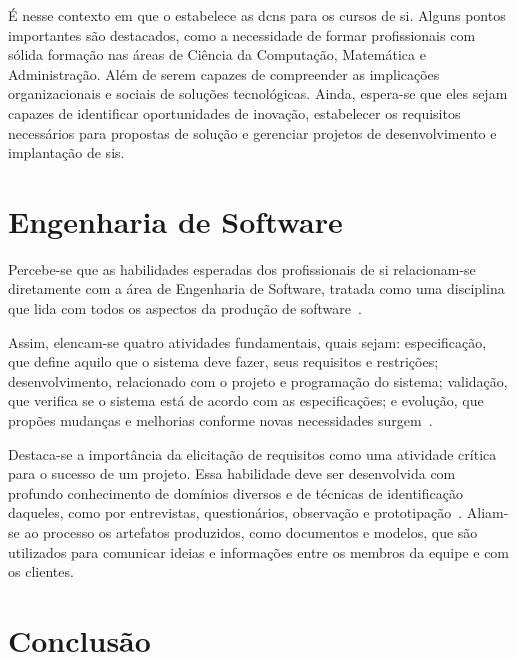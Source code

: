 \documentclass[12pt]{article}
\begin{document}
É nesse contexto em que o \textcite{mec2016dcn} estabelece as \glspl{dcn} para os cursos de \gls{si}.
Alguns pontos importantes são destacados, como a necessidade de formar profissionais com sólida formação nas áreas de Ciência da Computação, Matemática e Administração.
Além de serem capazes de compreender as implicações organizacionais e sociais de soluções tecnológicas.
Ainda, espera-se que eles sejam capazes de identificar oportunidades de inovação, estabelecer os requisitos necessários para propostas de solução e gerenciar projetos de desenvolvimento e implantação de \glspl{si}.

\section{Engenharia de Software}%
\label{sec:engenharia_de_software}

Percebe-se que as habilidades esperadas dos profissionais de \gls{si} relacionam-se diretamente com a área de Engenharia de Software, tratada como uma disciplina que lida com todos os aspectos da produção de software~\cite{sommerville2011software}.

Assim, elencam-se quatro atividades fundamentais, quais sejam: especificação, que define aquilo que o sistema deve fazer, seus requisitos e restrições; desenvolvimento, relacionado com o projeto e programação do sistema; validação, que verifica se o sistema está de acordo com as especificações; e evolução, que propões mudanças e melhorias conforme novas necessidades surgem~\cite{sommerville2011software}.

Destaca-se a importância da elicitação de requisitos como uma atividade crítica para o sucesso de um projeto.
Essa habilidade deve ser desenvolvida com profundo conhecimento de domínios diversos e de técnicas de identificação daqueles, como por entrevistas, questionários, observação e prototipação~\cite{sommerville2011software}.
Aliam-se ao processo os artefatos produzidos, como documentos e modelos, que são utilizados para comunicar ideias e informações entre os membros da equipe e com os clientes.

\section{Conclusão}%
\label{sec:conclusao}



\printbibliography{}
\end{document}

